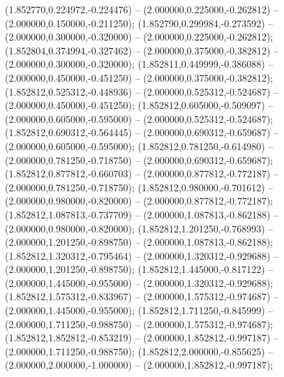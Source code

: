  (1.852770,0.224972,-0.224476) -- (2.000000,0.225000,-0.262812) -- (2.000000,0.150000,-0.211250);
 (1.852790,0.299984,-0.273592) -- (2.000000,0.300000,-0.320000) -- (2.000000,0.225000,-0.262812);
 (1.852804,0.374994,-0.327462) -- (2.000000,0.375000,-0.382812) -- (2.000000,0.300000,-0.320000);
 (1.852811,0.449999,-0.386088) -- (2.000000,0.450000,-0.451250) -- (2.000000,0.375000,-0.382812);
 (1.852812,0.525312,-0.448936) -- (2.000000,0.525312,-0.524687) -- (2.000000,0.450000,-0.451250);
 (1.852812,0.605000,-0.509097) -- (2.000000,0.605000,-0.595000) -- (2.000000,0.525312,-0.524687);
 (1.852812,0.690312,-0.564445) -- (2.000000,0.690312,-0.659687) -- (2.000000,0.605000,-0.595000);
 (1.852812,0.781250,-0.614980) -- (2.000000,0.781250,-0.718750) -- (2.000000,0.690312,-0.659687);
 (1.852812,0.877812,-0.660703) -- (2.000000,0.877812,-0.772187) -- (2.000000,0.781250,-0.718750);
 (1.852812,0.980000,-0.701612) -- (2.000000,0.980000,-0.820000) -- (2.000000,0.877812,-0.772187);
 (1.852812,1.087813,-0.737709) -- (2.000000,1.087813,-0.862188) -- (2.000000,0.980000,-0.820000);
 (1.852812,1.201250,-0.768993) -- (2.000000,1.201250,-0.898750) -- (2.000000,1.087813,-0.862188);
 (1.852812,1.320312,-0.795464) -- (2.000000,1.320312,-0.929688) -- (2.000000,1.201250,-0.898750);
 (1.852812,1.445000,-0.817122) -- (2.000000,1.445000,-0.955000) -- (2.000000,1.320312,-0.929688);
 (1.852812,1.575312,-0.833967) -- (2.000000,1.575312,-0.974687) -- (2.000000,1.445000,-0.955000);
 (1.852812,1.711250,-0.845999) -- (2.000000,1.711250,-0.988750) -- (2.000000,1.575312,-0.974687);
 (1.852812,1.852812,-0.853219) -- (2.000000,1.852812,-0.997187) -- (2.000000,1.711250,-0.988750);
 (1.852812,2.000000,-0.855625) -- (2.000000,2.000000,-1.000000) -- (2.000000,1.852812,-0.997187);
